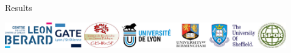 \documentclass[final]{beamer}
\newlength{\sepwid}
\newlength{\onecolwid}
\begin{document}
\begin{frame}[t]
\begin{columns}[t]
\begin{column}{\onecolwid}
\begin{columns}
\begin{column}{\onecolwid}
\begin{block}{Results}
\vspace{-1.7cm}
\begin{center}
\includegraphics[width=2\linewidth]{logo3.png}
\end{center}


\end{block}


\end{column} %

\end{columns} %

\end{column} %

\begin{column}{\sepwid}\end{column} %

\begin{column}{\onecolwid} %



\end{column}
\end{columns}
\end{frame}
\end{document}
